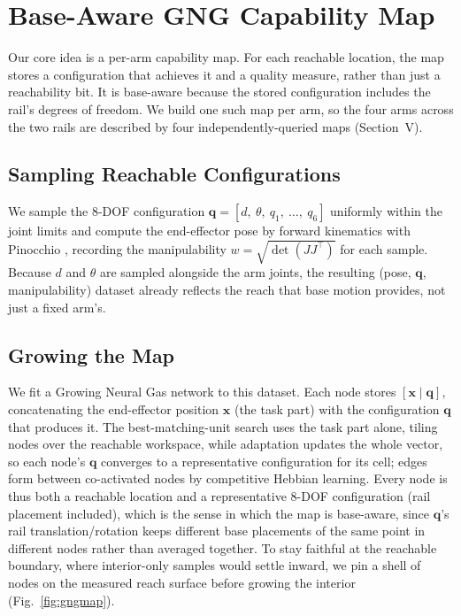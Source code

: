\documentclass[conference]{IEEEtran}
\begin{document}
\section{Base-Aware GNG Capability Map}

Our core idea is a per-arm capability map. For each reachable
location, the map stores a configuration that achieves it and a quality measure,
rather than just a reachability bit. It is base-aware because the stored
configuration includes the rail's degrees of freedom. We build one such map per
arm, so the four arms across the two rails are described by four
independently-queried maps (Section~V).

\subsection{Sampling Reachable Configurations}

We sample the 8-DOF configuration
$\mathbf{q} = [d,\ \theta,\ q_1,\ \ldots,\ q_6]$ uniformly within the joint limits
and compute the end-effector pose by forward kinematics with Pinocchio
\cite{Carpentier2019}, recording the manipulability $w = \sqrt{\det(JJ^\top)}$
\cite{Yoshikawa1985} for each sample. Because $d$ and $\theta$ are sampled
alongside the arm joints, the resulting (pose, $\mathbf{q}$, manipulability)
dataset already reflects the reach that base motion provides, not just a fixed
arm's.

\subsection{Growing the Map}

We fit a Growing Neural Gas network \cite{Fritzke1995} to this
dataset. Each node stores $[\mathbf{x} \mid \mathbf{q}]$, concatenating the
end-effector position $\mathbf{x}$ (the task part) with the configuration
$\mathbf{q}$ that produces it. The best-matching-unit search uses the task part
alone, tiling nodes over the reachable workspace, while adaptation updates the
whole vector, so each node's $\mathbf{q}$ converges to a representative
configuration for its cell; edges form between co-activated nodes by competitive
Hebbian learning. Every node is thus both a reachable location and a
representative 8-DOF configuration (rail placement included), which is the sense in
which the map is base-aware, since $\mathbf{q}$'s rail translation/rotation keeps
different base placements of the same point in different nodes rather than
averaged together. To stay faithful at the reachable boundary, where
interior-only samples would settle inward, we pin a shell of nodes on the
measured reach surface before growing the interior (Fig.~\ref{fig:gngmap}).
\end{document}
